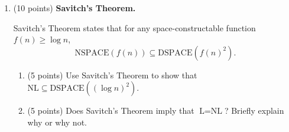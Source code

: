 \documentclass[11pt]{article}
\begin{document}
\begin{enumerate}
\begin{enumerate}
\end{enumerate}
    \begin{answer}

\end{answer}
\item (10 points) \textbf{Savitch's Theorem.} 

Savitch's Theorem states that for any space-constructable function  \( f(n) \ge \log n \),
\[
\text{NSPACE}(f(n)) \subseteq \text{DSPACE}(f(n)^2).
\]

\begin{enumerate}
    \item (5 points) Use Savitch's Theorem to show that \( \text{NL} \subseteq \text{DSPACE}((\log n)^2) \).
   
    \item (5 points) Does Savitch's Theorem imply that \( \text{L} = \text{NL} \)? Briefly explain why or why not.

\end{enumerate}
 \begin{answer}

\end{answer}
\end{enumerate}
    
\end{document}
